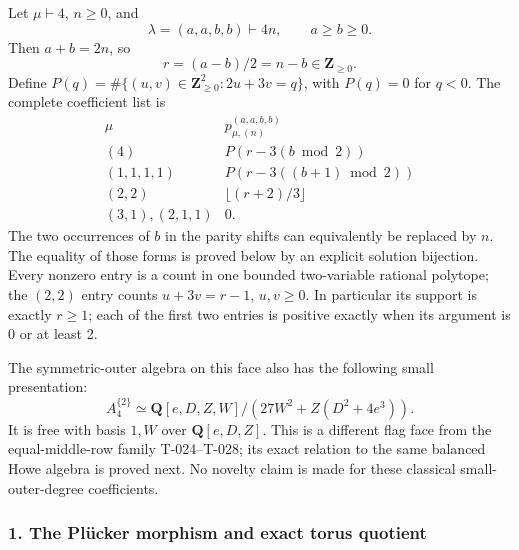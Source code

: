 \documentclass[
  10pt,
]{article}
\begin{document}
Let \(\mu\vdash4\), \(n\ge0\), and \[
\lambda=(a,a,b,b)\vdash4n,\qquad a\ge b\ge0.
\] Then \(a+b=2n\), so \[
r=(a-b)/2=n-b\in\mathbf Z_{\ge0}.
\] Define \(P(q)=\#\{(u,v)\in\mathbf Z_{\ge0}^2:2u+3v=q\}\), with
\(P(q)=0\) for \(q<0\). The complete coefficient list is \[
\boxed{
\begin{array}{c|c}
\mu & p_{\mu,(n)}^{(a,a,b,b)}\\ \hline
(4)&P(r-3(b\bmod2))\\
(1,1,1,1)&P(r-3((b+1)\bmod2))\\
(2,2)&\lfloor(r+2)/3\rfloor\\
(3,1),(2,1,1)&0.
\end{array}}
\tag{P.1}
\] The two occurrences of \(b\) in the parity shifts can equivalently be
replaced by \(n\). The equality of those forms is proved below by an
explicit solution bijection. Every nonzero entry is a count in one
bounded two-variable rational polytope; the \((2,2)\) entry counts
\(u+3v=r-1\), \(u,v\ge0\). In particular its support is exactly
\(r\ge1\); each of the first two entries is positive exactly when its
argument is 0 or at least 2.

The symmetric-outer algebra on this face also has the following small
presentation: \[
\boxed{
A_4^{\{2\}}
\simeq\mathbf Q[e,D,Z,W]
/(27W^2+Z(D^2+4e^3)).}
\tag{P.2}
\] It is free with basis \(1,W\) over \(\mathbf Q[e,D,Z]\). This is a
different flag face from the equal-middle-row family T-024--T-028; its
exact relation to the same balanced Howe algebra is proved next. No
novelty claim is made for these classical small-outer-degree
coefficients.

\subsubsection{1. The Plücker morphism and exact torus
quotient}\label{the-pluxfccker-morphism-and-exact-torus-quotient}
\end{document}
